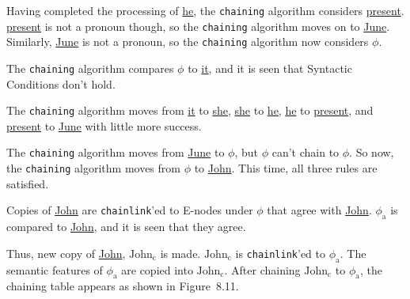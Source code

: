 \documentclass{article}
\begin{document}
Having completed the processing of \underline{he}, the
\texttt{chaining} algorithm considers
\underline{present}. \underline{present} is not a pronoun
though, so the \texttt{chaining} algorithm moves on to
\underline{June}.  Similarly, \underline{June} is not a pronoun,
so the \texttt{chaining} algorithm now considers
\underline{${\phi}$}.

The \texttt{chaining} algorithm compares \underline{${\phi}$} to
\underline{it}, and it is seen that Syntactic Conditions don't
hold.

\bigbreak
\vbox{}
\bigbreak

The \texttt{chaining} algorithm moves from \underline{it} to
\underline{she}, \underline{she} to \underline{he},
\underline{he} to \underline{present}, and
\underline{present} to \underline{June} with little more
success.

\bigbreak
\vbox{}
\bigbreak

The \texttt{chaining} algorithm moves from \underline{June} to
\underline{${\phi}$}, but \underline{${\phi}$} can't chain to
\underline{${\phi}$}. So now, the \texttt{chaining} algorithm moves
from \underline{${\phi}$} to \underline{John}. This time, all three
rules are satisfied.

\bigbreak
\vbox{}
\bigbreak

\noindent Copies of \underline{John} are \texttt{chainlink}'ed
to E-nodes under \underline{${\phi}$} that agree with
\underline{John}. \underline{${\phi_{\textrm{a}}}$} is compared to
\underline{John}, and it is seen that they agree.

\bigbreak
\vbox{}
\bigbreak

\noindent Thus, new copy of \underline{John},
\underline{${\textrm{John}_{\textrm{c}}}$} is made.
\underline{${\textrm{John}_{\textrm{c}}}$} is \texttt{chainlink}'ed to \underline{${\phi_{\textrm{a}}}$}.
The semantic features of \underline{${\phi_{\textrm{a}}}$} are
copied into \underline{${\textrm{John}_{\textrm{c}}}$}. After chaining
\underline{${\textrm{John}_{\textrm{c}}}$} to \underline{${\phi_{\textrm{a}}}$}, the
chaining table appears as shown in Figure~8.11.
\end{document}
